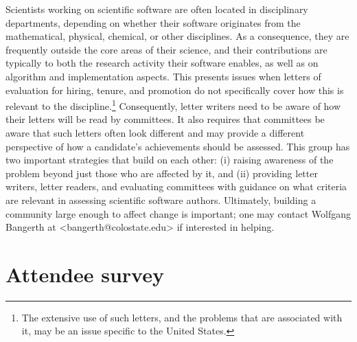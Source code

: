 \documentclass[11pt, oneside]{amsart}
\newcommand{\note}[1]{ {\textcolor{blueish}    { ***Note:      #1 }}}
\begin{document}
Scientists working on scientific software are often located in
disciplinary departments, depending on whether their software
originates from the mathematical, physical, chemical, or other
disciplines. As a consequence, they are frequently outside the core
areas of their science, and their contributions are typically to both
the research activity their software enables, as well as on
algorithm and implementation aspects. This presents issues when
letters of evaluation for hiring, tenure, and promotion do not specifically
cover how this is relevant to the discipline.\footnote{The extensive use of such letters, and the problems that are associated with it, may be an issue specific to the United States.}
%
Consequently, letter writers need to be aware of how their letters will be read by
committees. It also requires that committees be aware that such
letters often look different and may provide a different perspective
of how a candidate's achievements should be assessed. 
%
This group has two important strategies that build on each
other: (i) raising awareness of the problem beyond just those who are
affected by it, and (ii) providing letter writers, letter readers, and
evaluating committees with guidance on what criteria are relevant in
assessing scientific software authors.
%
Ultimately, building a community large enough
to affect change is important; one may contact Wolfgang Bangerth at
<bangerth@colostate.edu> if interested in helping.



\section{Attendee survey \label{sec:survey}}

\end{document}

